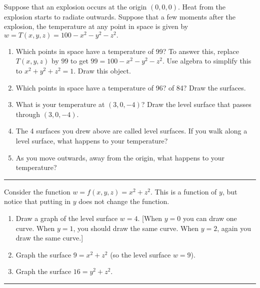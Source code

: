 \begin{problem}%
%
 Suppose that an explosion occurs at the origin $(0,0,0)$. Heat from the explosion starts to radiate outwards.  Suppose that a few moments after the explosion, the temperature at any point in space is given by $w=T(x,y,z)=100-x^2-y^2-z^2.$ 
\begin{enumerate}
 \item Which points in space have a temperature of 99?  To answer this, replace $T(x,y,z)$ by $99$ to get $99=100-x^2-y^2-z^2$. Use algebra to simplify this to $x^2+y^2+z^2=1$.  Draw this object.
 \item Which points in space have a temperature of 96? of 84? Draw the surfaces. 
 \item What is your temperature at $(3,0,-4)$? Draw the level surface that passes through $(3,0,-4)$.
\item The 4 surfaces you drew above are called level surfaces. If you walk along a level surface, what happens to your temperature?
 \item As you move outwards, away from the origin, what happens to your temperature?
\end{enumerate}
\hrule\end{problem}


\begin{problem}
Consider the function $w=f(x,y,z)=x^2+z^2$. This is a function of $y$, but notice that putting in $y$ does not change the function. 
 \begin{enumerate}
  \item Draw a graph of the level surface $w=4$. [When $y=0$ you can draw one curve.  When $y=1$, you should draw the same curve.  When $y=2$, again you draw the same curve.]
  \item Graph the surface $9=x^2+z^2$ (so the level surface $w=9$).
  \item Graph the surface $16=y^2+z^2$.
 \end{enumerate}
\hrule\end{problem}

